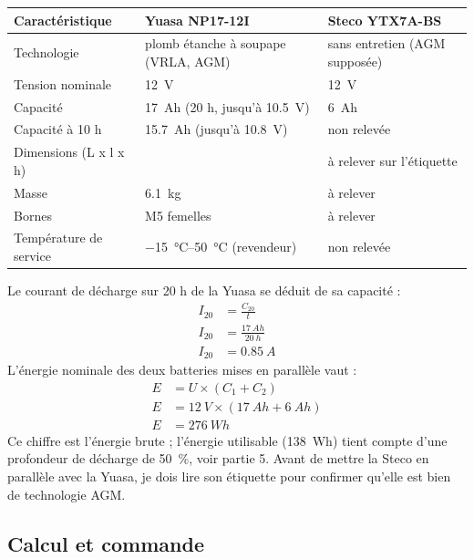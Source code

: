 \noindent
\begin{table}[H]
\centering
\begin{tabularx}{\linewidth}{lYY}
\hline
Caractéristique & Yuasa NP17-12I & Steco YTX7A-BS \\
\hline
Technologie & plomb étanche à soupape (VRLA, AGM) & sans entretien (AGM supposée) \\
Tension nominale & \qty{12}{V} & \qty{12}{V} \\
Capacité & \qty{17}{Ah} (20 h, jusqu'à \qty{10,5}{V}) & \qty{6}{Ah} \\
Capacité à 10 h & \qty{15,7}{Ah} (jusqu'à \qty{10,8}{V}) & non relevée \\
Dimensions (L x l x h) &  & à relever sur l'étiquette \\
Masse & \qty{6,1}{kg} & à relever \\
Bornes & M5 femelles & à relever \\
Température de service & \qtyrange{-15}{50}{\celsius} (revendeur) & non relevée \\
\hline
\end{tabularx}
\end{table}
Le courant de décharge sur 20 h de la Yuasa se déduit de sa capacité :
\begin{align*}
I_{20} &= \frac{C_{20}}{t}\\
I_{20} &= \frac{\qty{17}{Ah}}{\qty{20}{h}}\\
I_{20} &= \qty{0,85}{A}
\end{align*}
L'énergie nominale des deux batteries mises en parallèle vaut :
\begin{align*}
E &= U \times (C_1 + C_2)\\
E &= \qty{12}{V} \times (\qty{17}{Ah} + \qty{6}{Ah})\\
E &= \qty{276}{Wh}
\end{align*}
Ce chiffre est l'énergie brute ; l'énergie utilisable (\qty{138}{Wh}) tient compte d'une profondeur de décharge de \qty{50}{\percent}, voir partie 5. Avant de mettre la Steco en parallèle avec la Yuasa, je dois lire son étiquette pour confirmer qu'elle est bien de technologie AGM.

\subsection*{Calcul et commande}

